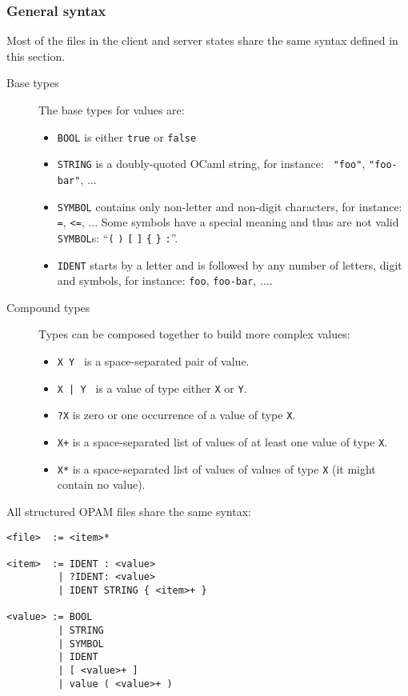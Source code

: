\documentclass[a4paper,11pt]{article}
\begin{document}
\subsubsection{General syntax}
\label{syntax}

Most of the files in the client and server states share the same
syntax defined in this section.

\begin{description}

\item[Base types] The base types for values are:

\begin{itemize}
\item {\tt BOOL} is  either {\tt true} or {\tt false}
\item {\tt STRING} is a doubly-quoted OCaml string, for instance: {\tt
  "foo"}, {\tt "foo-bar"}, $\ldots$
\item {\tt SYMBOL} contains only non-letter and non-digit characters,
  for instance: {\tt =}, {\tt <=}, $\ldots$ Some symbols have a special
  meaning and thus are not valid {\tt SYMBOL}s: ``\verb+(+ \verb+)+
  \verb+[+ \verb+]+ \verb+{+ \verb+}+ \verb+:+''.
\item {\tt IDENT} starts by a letter and is followed by any number of
  letters, digit and symbols, for instance: {\tt foo}, {\tt foo-bar},
  $\ldots$. 
\end{itemize}


\item[Compound types] Types can be composed together to build more
  complex values:

\begin{itemize}
\item {\tt X Y } is a space-separated pair of value.
\item {\tt X | Y } is a value of type either {\tt X} or {\tt Y}.
\item {\tt ?X} is zero or one occurrence of a value of type {\tt X}.
\item {\tt X+} is a space-separated list of values of at least one value
  of type {\tt X}.
\item {\tt X*} is a space-separated list of values of values of type
  {\tt X} (it might contain no value).
\end{itemize}

\end{description}

All structured OPAM files share the same syntax:

{\small
\begin{Verbatim}[frame=single]
<file>  := <item>*

<item>  := IDENT : <value>
         | ?IDENT: <value>
         | IDENT STRING { <item>+ }

<value> := BOOL
         | STRING
         | SYMBOL
         | IDENT
         | [ <value>+ ]
         | value ( <value>+ )
\end{Verbatim}
}
\end{document}
